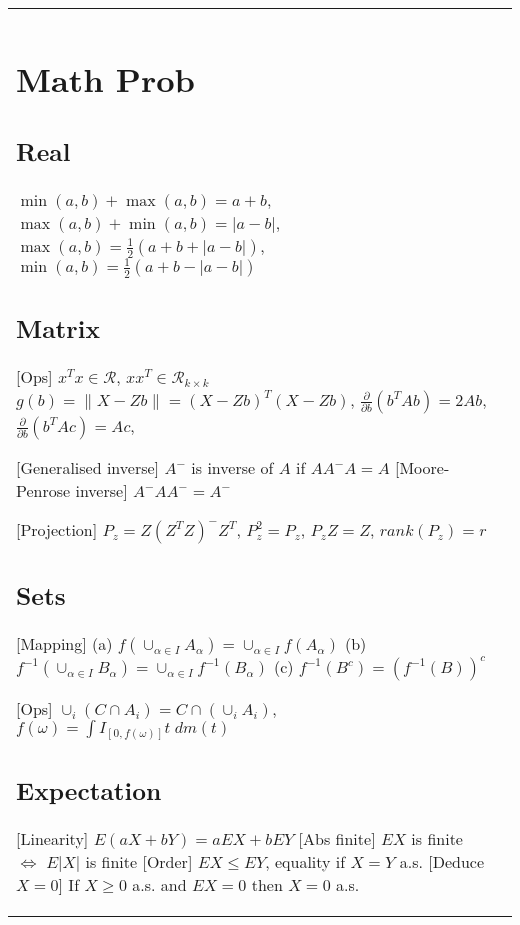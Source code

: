 \begin{tabulary}{\textwidth}{l || L}

	\section{Math Prob}

	\subsection{Real}

	$\min(a, b) + \max(a, b) = a + b$,
	$\max(a, b) + \min(a, b) = |a - b|$,
	$\max(a, b) = \frac{1}{2} (a + b + |a - b|)$,
	$\min(a, b) = \frac{1}{2} (a + b - |a - b|)$

	\subsection{Matrix}

	[Ops]
	$x^Tx\in\mathcal{R}$,
	$xx^T \in \mathcal{R}_{k\times k}$
	$g(b) = \lVert X - Zb \rVert = (X - Zb)^T (X - Zb)$,
	$\frac{\partial}{\partial b} (b^T A b) = 2Ab$,
	$\frac{\partial}{\partial b} (b^T A c) = Ac$,

	[Generalised inverse]
	$A^-$ is inverse of $A$ if $AA^-A = A$
	[Moore-Penrose inverse]
	$A^- A A^- = A^-$

	[Projection]
	$P_z = Z(Z^TZ)^- Z^T$, $P_z^2 = P_z$, $P_z Z = Z$, $rank(P_z) =
		r$

	\subsection{Sets}

	[Mapping]
	(a) $f\left( \cup_{\alpha\in I} A_\alpha \right) = \cup_{\alpha\in
			I}f(A_\alpha)$
	(b) $f^{-1}\left(\cup_{\alpha\in I} B_\alpha \right) =
		\cup_{\alpha\in I}f^{-1}(B_\alpha)$
	(c) $f^{-1}(B^c) = (f^{-1}(B))^c$

	[Ops]
	$\cup_i (C\cap A_i) = C\cap (\cup_i A_i)$,
	$f(\omega) = \int I_{[0, f(\omega)]}t \; dm(t)$

	\subsection{Expectation}

	[Linearity] $E(aX + bY) = aEX + bEY$
	[Abs finite] $EX$ is finite $\Leftrightarrow$ $E|X|$ is finite
		[Order] $EX \leq EY$, equality if $X=Y$ a.s.
		[Deduce $X=0$] If $X\geq 0$ a.s. and $EX=0$ then $X=0$ a.s.


\end{tabulary}
